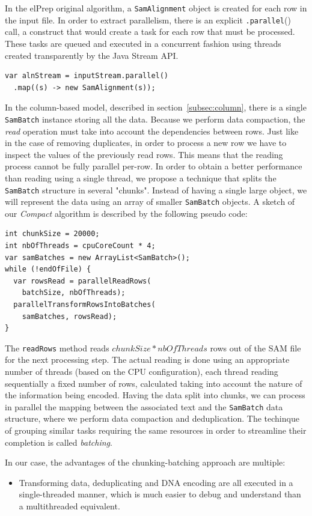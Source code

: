 \documentclass[a4paper,twoside]{article}
\begin{document}
{In the elPrep original algorithm, a {\texttt{SamAlignment}} object is created for each row in the input file.
In order to extract parallelism, there is an explicit {\texttt{.parallel}()} call, a construct that would create a task for each row that must be processed.
These tasks are queued and executed in a concurrent fashion using threads created transparently by the Java Stream API.
\begin{verbatim}
var alnStream = inputStream.parallel()
  .map((s) -> new SamAlignment(s));
\end{verbatim}
In the column-based model, described in section~\ref{subsec:column}, there is a single {\texttt{SamBatch}} instance storing all the data.
Because we perform data compaction, the {\textit{read}} operation must take into account the dependencies between rows.
Just like in the case of removing duplicates, in order to process a new row we have to inspect the values of the previously read rows.
This means that the reading process cannot be fully parallel per-row.
In order to obtain a better performance than reading using a single thread, we propose a technique that splits the {\texttt{SamBatch}} structure in several "chunks".
Instead of having a single large object, we will represent the data using an array of smaller {\texttt{SamBatch}} objects.
A sketch of our {\textit{Compact}} algorithm is described by the following pseudo code:

\begin{verbatim}
int chunkSize = 20000;
int nbOfThreads = cpuCoreCount * 4;
var samBatches = new ArrayList<SamBatch>();
while (!endOfFile) {
  var rowsRead = parallelReadRows(
    batchSize, nbOfThreads);
  parallelTransformRowsIntoBatches(
    samBatches, rowsRead);
}
\end{verbatim}

The {\texttt{readRows}} method reads $chunkSize * nbOfThreads$ rows out of the SAM file for the next processing step.
The actual reading is done using an appropriate number of threads (based on the CPU configuration), each thread reading sequentially a fixed number of rows, calculated taking into account the nature of the information being encoded.
Having the data split into chunks, we can process in parallel the mapping between the associated text and the {\texttt{SamBatch}} data structure, where we perform data compaction and deduplication.
The techinque of grouping similar tasks requiring the same resources in order to streamline their completion is called {\textit{batching}}.

In our case, the advantages of the chunking-batching approach are multiple:
\begin{itemize}
\item Transforming data, deduplicating and DNA encoding are all executed in a single-threaded manner, which is much easier to debug and understand than a multithreaded equivalent.


\end{itemize}}
\end{document}
